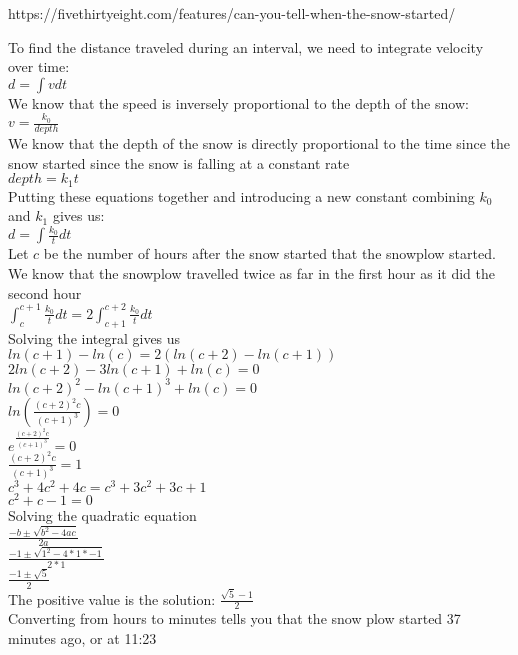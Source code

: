 \documentclass{article}
\begin{document}
\begin{flushleft}

https://fivethirtyeight.com/features/can-you-tell-when-the-snow-started/

To find the distance traveled during an interval, we need to integrate velocity over time: \\
$d  = \int v dt$ \\
\medskip
We know that the speed is inversely proportional to the depth of the snow: \\
$v = \frac{k_0}{depth}$ \\
\medskip
We know that the depth of the snow is directly proportional to the time since the snow started since the snow is falling at a constant rate \\
$depth = k_1 t$ \\
\medskip
Putting these equations together and introducing a new constant combining $k_0$ and $k_1$ gives us:\\
$d = \int \frac{k_0}{t} dt$\\
\bigskip
Let $c$ be the number of hours after the snow started that the snowplow started. We know that the snowplow travelled twice as far in the first hour as it did the second hour \\
$\int_{c}^{c+1} \frac{k_0}{t} dt  = 2 \int_{c+1}^{c+2} \frac{k_0}{t} dt$\\
\bigskip
Solving the integral gives us \\
$ln(c+1) - ln(c) = 2(ln(c+2) - ln(c+1))$ \\
\smallskip
$2ln(c+2) - 3ln(c+1) + ln(c) = 0$ \\
\smallskip
$ln(c+2)^2 - ln(c+1)^3 + ln(c) = 0$\\
\smallskip
$ln(\frac{(c+2)^2c}{(c+1)^3}) = 0$\\
\smallskip
$e^{\frac{(c+2)^2c}{(c+1)^3}} = 0$\\
\smallskip
$\frac{(c+2)^2c}{(c+1)^3} = 1$\\
\smallskip
$c^3 + 4c^2 + 4c = c^3 + 3c^2 + 3c + 1$\\
\smallskip
$c^2 + c - 1 = 0$ \\
\medskip
Solving the quadratic equation \\
$\frac{-b \pm \sqrt{b^2 - 4ac}}{2a}$\\
\smallskip
$\frac{-1 \pm \sqrt{1^2 - 4*1*-1}}{2*1}$\\
$\frac{-1 \pm \sqrt{5}}{2}$ \\
\medskip
The positive value is the solution:
$\frac{\sqrt{5} - 1}{2}$ \\
\medskip
Converting from hours to minutes tells you that the snow plow started 37 minutes ago, or at 11:23
\end{flushleft}
\end{document}

